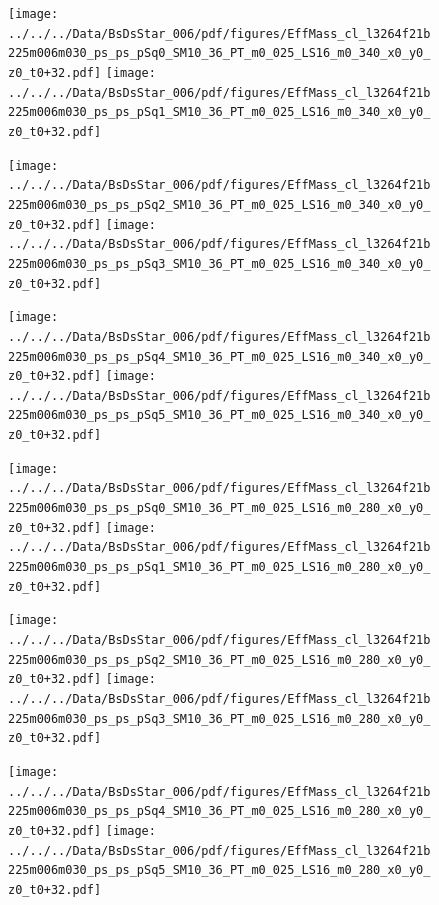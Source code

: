 \documentclass[a4paper,10pt]{article}
\begin{document}
\begin{figure}[p]
 \texttt{[image: ../../../Data/BsDsStar\_006/pdf/figures/EffMass\_cl\_l3264f21b225m006m030\_ps\_ps\_pSq0\_SM10\_36\_PT\_m0\_025\_LS16\_m0\_340\_x0\_y0\_z0\_t0+32.pdf]} 
 \texttt{[image: ../../../Data/BsDsStar\_006/pdf/figures/EffMass\_cl\_l3264f21b225m006m030\_ps\_ps\_pSq1\_SM10\_36\_PT\_m0\_025\_LS16\_m0\_340\_x0\_y0\_z0\_t0+32.pdf]} 
 \end{figure}
\begin{figure}[p]
 \texttt{[image: ../../../Data/BsDsStar\_006/pdf/figures/EffMass\_cl\_l3264f21b225m006m030\_ps\_ps\_pSq2\_SM10\_36\_PT\_m0\_025\_LS16\_m0\_340\_x0\_y0\_z0\_t0+32.pdf]} 
 \texttt{[image: ../../../Data/BsDsStar\_006/pdf/figures/EffMass\_cl\_l3264f21b225m006m030\_ps\_ps\_pSq3\_SM10\_36\_PT\_m0\_025\_LS16\_m0\_340\_x0\_y0\_z0\_t0+32.pdf]} 
 \end{figure}
\begin{figure}[p]
 \texttt{[image: ../../../Data/BsDsStar\_006/pdf/figures/EffMass\_cl\_l3264f21b225m006m030\_ps\_ps\_pSq4\_SM10\_36\_PT\_m0\_025\_LS16\_m0\_340\_x0\_y0\_z0\_t0+32.pdf]} 
 \texttt{[image: ../../../Data/BsDsStar\_006/pdf/figures/EffMass\_cl\_l3264f21b225m006m030\_ps\_ps\_pSq5\_SM10\_36\_PT\_m0\_025\_LS16\_m0\_340\_x0\_y0\_z0\_t0+32.pdf]} 
 \end{figure}
\clearpage
\begin{figure}[p]
 \texttt{[image: ../../../Data/BsDsStar\_006/pdf/figures/EffMass\_cl\_l3264f21b225m006m030\_ps\_ps\_pSq0\_SM10\_36\_PT\_m0\_025\_LS16\_m0\_280\_x0\_y0\_z0\_t0+32.pdf]} 
 \texttt{[image: ../../../Data/BsDsStar\_006/pdf/figures/EffMass\_cl\_l3264f21b225m006m030\_ps\_ps\_pSq1\_SM10\_36\_PT\_m0\_025\_LS16\_m0\_280\_x0\_y0\_z0\_t0+32.pdf]} 
 \end{figure}
\begin{figure}[p]
 \texttt{[image: ../../../Data/BsDsStar\_006/pdf/figures/EffMass\_cl\_l3264f21b225m006m030\_ps\_ps\_pSq2\_SM10\_36\_PT\_m0\_025\_LS16\_m0\_280\_x0\_y0\_z0\_t0+32.pdf]} 
 \texttt{[image: ../../../Data/BsDsStar\_006/pdf/figures/EffMass\_cl\_l3264f21b225m006m030\_ps\_ps\_pSq3\_SM10\_36\_PT\_m0\_025\_LS16\_m0\_280\_x0\_y0\_z0\_t0+32.pdf]} 
 \end{figure}
\begin{figure}[p]
 \texttt{[image: ../../../Data/BsDsStar\_006/pdf/figures/EffMass\_cl\_l3264f21b225m006m030\_ps\_ps\_pSq4\_SM10\_36\_PT\_m0\_025\_LS16\_m0\_280\_x0\_y0\_z0\_t0+32.pdf]} 
 \texttt{[image: ../../../Data/BsDsStar\_006/pdf/figures/EffMass\_cl\_l3264f21b225m006m030\_ps\_ps\_pSq5\_SM10\_36\_PT\_m0\_025\_LS16\_m0\_280\_x0\_y0\_z0\_t0+32.pdf]} 
 \end{figure}
\clearpage
\clearpage
\end{document}
